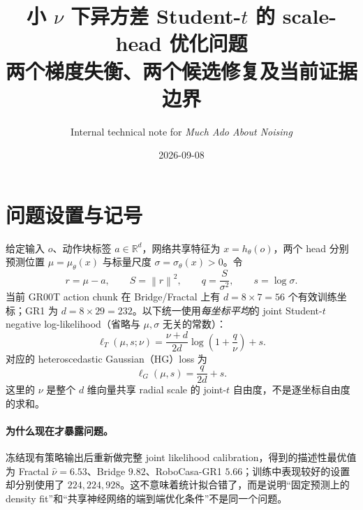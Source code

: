 \documentclass[10pt]{article}
\title{\vspace{-1.5em}\textbf{小 $\nu$ 下异方差 Student-$t$ 的 scale-head 优化问题}\\[-0.1em]
\large 两个梯度失衡、两个候选修复及当前证据边界}
\author{Internal technical note for \emph{Much Ado About Noising}}
\date{2026-09-08}
\newcommand{\R}{\mathbb{R}}
\newcommand{\norm}[1]{\left\lVert#1\right\rVert}
\begin{document}
\maketitle
\vspace{-1.5em}

\noindent{}

\section{问题设置与记号}

给定输入 $o$、动作块标签 $a\in\R^d$，网络共享特征为 $x=h_\theta(o)$，两个 head 分别预测位置 $\mu=\mu_\theta(x)$ 与标量尺度 $\sigma=\sigma_\theta(x)>0$。令
\begin{equation}
 r=\mu-a,\qquad S=\norm{r}^2,\qquad q=\frac{S}{\sigma^2},\qquad s=\log\sigma .
 \label{eq:notation}
\end{equation}
当前 GR00T action chunk 在 Bridge/Fractal 上有 $d=8\times7=56$ 个有效训练坐标；GR1 为 $d=8\times29=232$。以下统一使用\emph{每坐标平均}的 joint Student-$t$ negative log-likelihood（省略与 $\mu,\sigma$ 无关的常数）：
\begin{equation}
 \ell_T(\mu,s;\nu)
 =\frac{\nu+d}{2d}\log\!\left(1+\frac{q}{\nu}\right)+s .
 \label{eq:t-nll}
\end{equation}
对应的 heteroscedastic Gaussian（HG）loss 为
\begin{equation}
 \ell_G(\mu,s)=\frac{q}{2d}+s .
 \label{eq:hg-nll}
\end{equation}
这里的 $\nu$ 是整个 $d$ 维向量共享 radial scale 的 joint-$t$ 自由度，不是逐坐标自由度的求和。

\paragraph{为什么现在才暴露问题。}
冻结现有策略输出后重新做完整 joint likelihood calibration，得到的描述性最优值为 Fractal $\hat\nu=6.53$、Bridge $9.82$、RoboCasa-GR1 $5.66$；训练中表现较好的设置却分别使用了 $224,224,928$。这不意味着统计拟合错了，而是说明“固定预测上的 density fit”和“共享神经网络的端到端优化条件”不是同一个问题。
\end{document}
